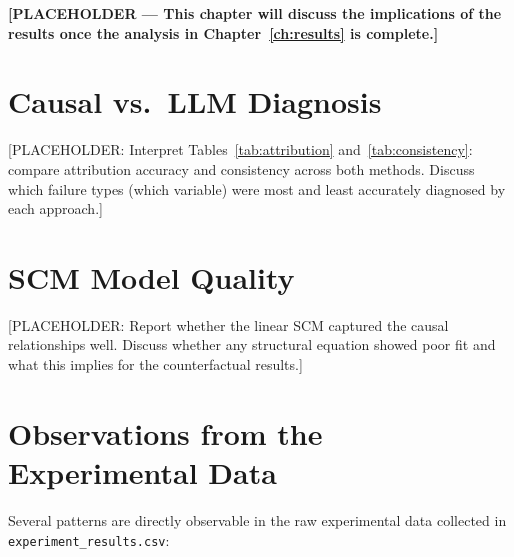 \documentclass[11pt,a4paper]{report}
\begin{document}
\textbf{[PLACEHOLDER --- This chapter will discuss the implications of the results once the analysis in Chapter~\ref{ch:results} is complete.]}

\section{Causal vs.\ LLM Diagnosis}

[PLACEHOLDER: Interpret Tables~\ref{tab:attribution} and~\ref{tab:consistency}: compare attribution accuracy and consistency across both methods. Discuss which failure types (which variable) were most and least accurately diagnosed by each approach.]

\section{SCM Model Quality}

[PLACEHOLDER: Report whether the linear SCM captured the causal relationships well. Discuss whether any structural equation showed poor fit and what this implies for the counterfactual results.]

\section{Observations from the Experimental Data}
\label{sec:observations}

Several patterns are directly observable in the raw experimental data collected in \texttt{experiment\_results.csv}:
\end{document}

